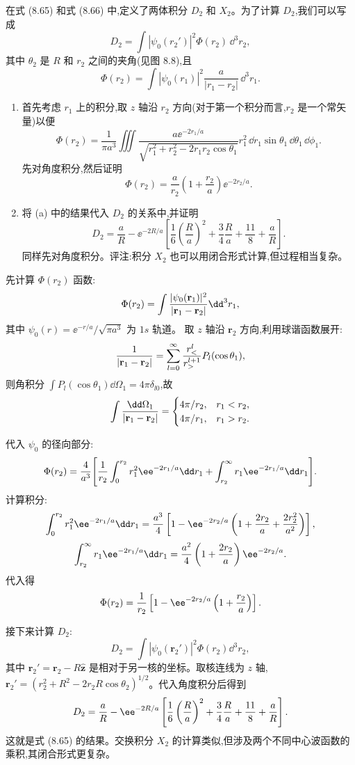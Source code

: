 \begin{question}
在式 (8.65) 和式 (8.66) 中,定义了两体积分 $D_2$ 和 $X_2$。为了计算 $D_2$,我们可以写成
\[
D_2=\int |\psi_0(r_2')|^2\Phi(r_2)\,\dd^3 r_2,
\]
其中 $\theta_2$ 是 $R$ 和 $r_2$ 之间的夹角(见图 8.8),且
\[
\Phi(r_2)=\int |\psi_0(r_1)|^2\frac{a}{|r_1-r_2|}\,\dd^3r_1.
\]
\begin{enumerate}
\item 首先考虑 $r_1$ 上的积分,取 $z$ 轴沿 $r_2$ 方向(对于第一个积分而言,$r_2$ 是一个常矢量)以便
\[
\Phi(r_2)=\frac{1}{\pi a^3}\iiint\frac{a \ee^{-2r_1/a}}{\sqrt{r_1^2+r_2^2-2r_1r_2\cos\theta_1}}r_1^2\,\dd r_1\sin\theta_1\,\dd\theta_1\,\dd\phi_1.
\]
先对角度积分,然后证明
\[
\Phi(r_2)=\frac{a}{r_2}\left(1+\frac{r_2}{a}\right)\ee^{-2r_2/a}.
\]
\item 将 (a) 中的结果代入 $D_2$ 的关系中,并证明
\[
D_2=\frac{a}{R}-\ee^{-2R/a}\left[\frac{1}{6}\left(\frac{R}{a}\right)^2+\frac34\frac{R}{a}+\frac{11}{8}+\frac{a}{R}\right].
\]
同样先对角度积分。评注:积分 $X_2$ 也可以用闭合形式计算,但过程相当复杂。
\end{enumerate}

\par\smallskip
{}

\begin{solution}
先计算 $\Phi(r_2)$ 函数:
\[
\Phi(r_2)=\int{|\psi_0(\mathbf r_1)|^2\over|\mathbf r_1-\mathbf r_2|}\dd^3r_1,
\]
其中 $\psi_0(r)=\ee^{-r/a}/\sqrt{\pi a^3}$ 为 $1s$ 轨道。
取 $z$ 轴沿 $\mathbf r_2$ 方向,利用球谐函数展开:
\[
{1\over|\mathbf r_1-\mathbf r_2|}=\sum_{l=0}^\infty{r_<^l\over r_>^{l+1}}P_l(\cos\theta_1),
\]
则角积分 $\int P_l(\cos\theta_1)\dd\Omega_1=4\pi\delta_{l0}$,故
\[
\int{\dd\Omega_1\over|\mathbf r_1-\mathbf r_2|}=
\begin{cases}
4\pi/r_2, & r_1<r_2,\\
4\pi/r_1, & r_1>r_2.
\end{cases}
\]

代入 $\psi_0$ 的径向部分:
\[
\Phi(r_2)={4\over a^3}\Bigg[{1\over r_2}\int_0^{r_2}r_1^2 \ee^{-2r_1/a}\dd r_1
+\int_{r_2}^\infty r_1 \ee^{-2r_1/a}\dd r_1\Bigg].
\]
计算积分:
\[
\int_0^{r_2}r_1^2\ee^{-2r_1/a}\dd r_1
={a^3\over4}\left[1-\ee^{-2r_2/a}\left(1+{2r_2\over a}+{2r_2^2\over a^2}\right)\right],
\]
\[
\int_{r_2}^\infty r_1 \ee^{-2r_1/a}\dd r_1
={a^2\over4}\left(1+{2r_2\over a}\right)\ee^{-2r_2/a}.
\]
代入得
\[
\Phi(r_2)={1\over r_2}\left[1-\ee^{-2r_2/a}\left(1+{r_2\over a}\right)\right].
\]

接下来计算 $D_2$:
\[
D_2=\int|\psi_0(\mathbf r_2')|^2\Phi(r_2)\dd^3 r_2,
\]
其中 $\mathbf r_2'=\mathbf r_2-R\hat{\mathbf z}$ 是相对于另一核的坐标。取核连线为 $z$ 轴,$\mathbf r_2'=(r_2^2+R^2-2r_2R\cos\theta_2)^{1/2}$。代入角度积分后得到
\[
D_2={a\over R}-\ee^{-2R/a}\left[{1\over6}\left({R\over a}\right)^2+{3\over4}{R\over a}+{11\over8}+{a\over R}\right].
\]
这就是式 (8.65) 的结果。交换积分 $X_2$ 的计算类似,但涉及两个不同中心波函数的乘积,其闭合形式更复杂。
\end{solution}
\end{question}

